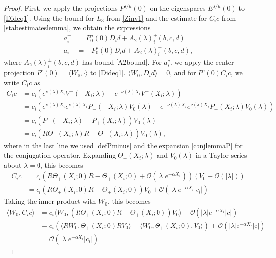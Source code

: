 \documentclass[thesis.tex]{subfiles}
\begin{document}
\begin{lemma}
\begin{proof}
First, we apply the projections $P^{s/u}(0)$ on the eigenspaces $E^{s/u}(0)$ to \eqref{Dideq1}. Using the bound for $L_3$ from \cref{Zinv1} and the estimate for $C_i c$ from \cref{stabestimateslemma}, we obtain the expressions
\begin{align*}
a_i^+ &= P_0^u(0) D_i d + A_2(\lambda)_i^+(b, c, d) \\
a_i^- &= -P_0^s(0) D_i d + A_2(\lambda)_i^-(b, c, d),
\end{align*}
where $A_2(\lambda)_i^\pm(b, c, d)$ has bound \cref{A2bound}. For $a_i^c$, we apply the center projection $P^c(0) = \langle W_0, \cdot \rangle$ to \eqref{Dideq1}. $\langle W_0, D_i d\rangle = 0$, and for $P^c(0) C_i c$, we write $C_i c$ as 
\begin{align*}
C_i c &= c_i \left( e^{\nu(\lambda) X_i} V^-(-X_i; \lambda) - e^{-\nu(\lambda) X_i} V^+(X_i; \lambda) \right) \\
&= c_i \left( e^{\nu(\lambda) X_i} e^{\nu(\lambda)X_i} P_-(-X_i; \lambda) V_0(\lambda) - e^{-\nu(\lambda) X_i} e^{\nu(\lambda)X_i} P_+(X_i; \lambda)V_0(\lambda) \right) \\
&= c_i \left( P_-(-X_i; \lambda) - P_+(X_i; \lambda) \right) V_0(\lambda) \\
&= c_i \left( R \Theta_+(X_i; \lambda) R - \Theta_+(X_i; \lambda) \right) V_0(\lambda),
\end{align*}
where in the last line we used \cref{defPminus} and the expansion \cref{conjlemmaP} for the conjugation operator. Expanding $\Theta_+(X_i; \lambda)$ and $V_0(\lambda)$ in a Taylor series about $\lambda = 0$, this becomes
\begin{align*}
C_i c &= c_i \left( R \Theta_+(X_i; 0) R - \Theta_+(X_i; 0) + \mathcal{O}(|\lambda|e^{-\alpha X_i}) \right) (V_0 + \mathcal{O}(|\lambda|)) \\
&= c_i \left( R \Theta_+(X_i; 0) R - \Theta_+(X_i; 0) \right) V_0 + \mathcal{O}(|\lambda|e^{-\alpha X_i}|c_i|)
\end{align*}
Taking the inner product with $W_0$, this becomes
\begin{align*}
\langle W_0, C_i c \rangle &=  c_i \langle W_0, \left( R \Theta_+(X_i; 0) R - \Theta_+(X_i; 0) \right) V_0 \rangle + \mathcal{O}(|\lambda|e^{-\alpha X_i}|c| ) \\
&= c_i \left( \langle R W_0, \Theta_+(X_i; 0) R V_0 \rangle - \langle W_0, \Theta_+(X_i; 0), V_0 \rangle \right) + \mathcal{O}(|\lambda|e^{-\alpha X_i}|c| ) \\
&= \mathcal{O}(|\lambda|e^{-\alpha X_i}|c_i| )

\end{align*}
\end{proof}
\end{lemma}
\end{document}
